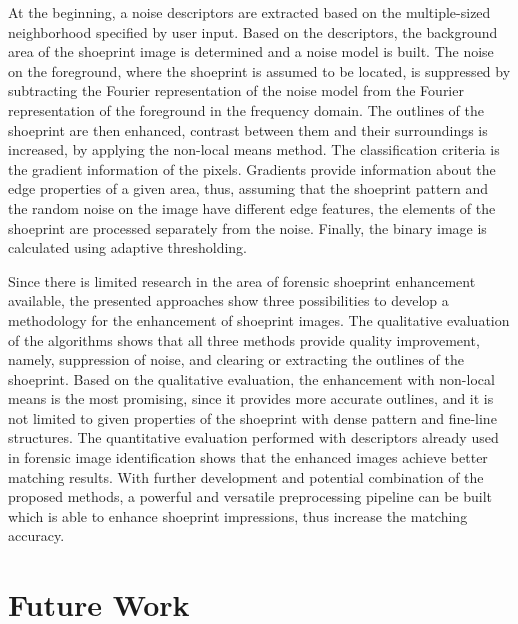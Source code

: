 \documentclass[draft,final]{vutinfth} %
\begin{document}
At the beginning, a  noise descriptors are extracted based on the multiple-sized neighborhood specified by user input.
Based on the descriptors, the background area of the shoeprint image is determined and a noise model is built.
The noise on the foreground, where the shoeprint is assumed to be located, is suppressed by subtracting the Fourier representation of the noise model from the Fourier representation of the foreground in the frequency domain.
The outlines of the shoeprint are then enhanced, contrast between them and their surroundings is increased, by applying the non-local means method.
The classification criteria is the gradient information of the pixels.
Gradients provide information about the edge properties of a given area, thus, assuming that the shoeprint pattern and the random noise on the image have different edge features, the elements of the shoeprint are processed separately from the noise.
Finally, the binary image is calculated using adaptive thresholding.
\par
Since there is limited research in the area of forensic shoeprint enhancement available, the presented approaches show three possibilities to develop a methodology for the enhancement of shoeprint images.
The qualitative evaluation of the algorithms shows that all three methods provide quality improvement, namely, suppression of noise, and clearing or extracting the outlines of the shoeprint. 
Based on the qualitative evaluation, the enhancement with non-local means is the most promising, since it provides more accurate outlines, and it is not limited to given properties of the shoeprint with dense pattern and fine-line structures.
The quantitative evaluation performed with descriptors already used in forensic image identification shows that the enhanced images achieve better matching results.
With further development and potential combination of the proposed methods, a powerful and versatile preprocessing pipeline can be built which is able to enhance shoeprint impressions, thus increase the matching accuracy.

\section*{Future Work}
\end{document}
